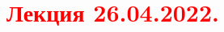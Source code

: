 \documentclass[main.tex]{subfiles}
\begin{document}
\section{\textcolor{red}{Лекция 26.04.2022.}}
\end{document}
